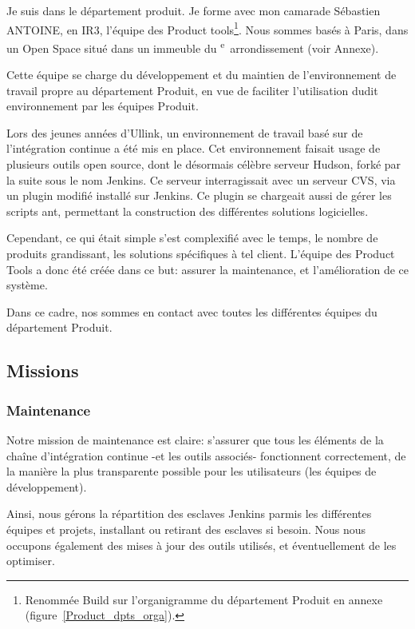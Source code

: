 \documentclass[a4paper, 12pt]{article}
\begin{document}
Je suis dans le département produit. Je forme avec mon camarade Sébastien ANTOINE, en IR3, l'équipe des Product tools\footnote{Renommée Build sur l'organigramme du département Produit en annexe (figure~\ref{Product_dpts_orga}).}. Nous sommes basés à Paris, dans un Open Space situé dans un immeuble du \textsc{}\textsuperscript{e}~arrondissement (voir Annexe).

Cette équipe se charge du développement et du maintien de l'environnement de travail propre au département Produit, en vue de faciliter l'utilisation dudit environnement par les équipes Produit.

Lors des jeunes années d'Ullink, un environnement de travail basé sur de l'intégration continue a été mis en place. Cet environnement faisait usage de plusieurs outils open source, dont le désormais célèbre serveur Hudson, forké par la suite sous le nom Jenkins. Ce serveur interragissait avec un serveur CVS, via un plugin modifié installé sur Jenkins. Ce plugin se chargeait aussi de gérer les scripts ant, permettant la construction des différentes solutions logicielles.

Cependant, ce qui était simple s'est complexifié avec le temps, le nombre de produits grandissant, les solutions spécifiques à tel client. L'équipe des Product Tools a donc été créée dans ce but: assurer la maintenance, et l'amélioration de ce système.

Dans ce cadre, nos sommes en contact avec toutes les différentes équipes du département Produit.

\subsection{Missions}
\subsubsection{Maintenance}

Notre mission de maintenance est claire: s'assurer que tous les éléments de la chaîne d'intégration continue -et les outils associés- fonctionnent correctement, de la manière la plus transparente possible pour les utilisateurs (les équipes de développement).

Ainsi, nous gérons la répartition des esclaves Jenkins parmis les différentes équipes et projets, installant ou retirant des esclaves si besoin. Nous nous occupons également des mises à jour des outils utilisés, et éventuellement de les optimiser.
\end{document}
